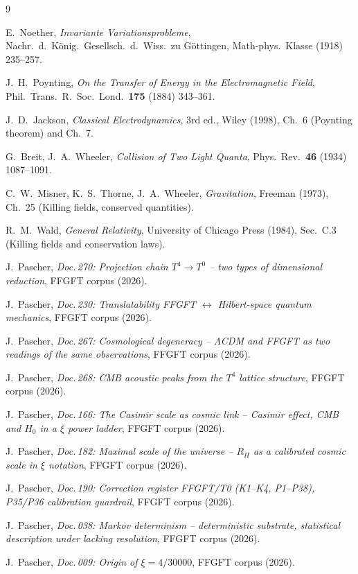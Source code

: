 \begin{thebibliography}{9}

E.~Noether,
\emph{Invariante Variationsprobleme},
Nachr.\ d.\ König.\ Gesellsch.\ d.\ Wiss.\ zu Göttingen,
Math-phys.\ Klasse (1918) 235--257.

J.~H.~Poynting,
\emph{On the Transfer of Energy in the Electromagnetic Field},
Phil.\ Trans.\ R.\ Soc.\ Lond.\ \textbf{175} (1884) 343--361.

J.~D.~Jackson,
\emph{Classical Electrodynamics}, 3rd ed.,
Wiley (1998), Ch.~6 (Poynting theorem) and Ch.~7.

G.~Breit, J.~A.~Wheeler,
\emph{Collision of Two Light Quanta},
Phys.\ Rev.\ \textbf{46} (1934) 1087--1091.

C.~W.~Misner, K.~S.~Thorne, J.~A.~Wheeler,
\emph{Gravitation},
Freeman (1973), Ch.~25 (Killing fields, conserved quantities).

R.~M.~Wald,
\emph{General Relativity},
University of Chicago Press (1984), Sec.~C.3 (Killing fields and conservation
laws).

J.~Pascher, \emph{Doc.\,270: Projection chain $T^4\to T^0$ -- two types of
dimensional reduction}, FFGFT corpus (2026).

J.~Pascher, \emph{Doc.\,230: Translatability FFGFT $\leftrightarrow$
Hilbert-space quantum mechanics}, FFGFT corpus (2026).

J.~Pascher, \emph{Doc.\,267: Cosmological degeneracy -- $\Lambda$CDM and FFGFT
as two readings of the same observations}, FFGFT corpus (2026).

J.~Pascher, \emph{Doc.\,268: CMB acoustic peaks from the $T^4$ lattice
structure}, FFGFT corpus (2026).

J.~Pascher, \emph{Doc.\,166: The Casimir scale as cosmic link -- Casimir
effect, CMB and $H_0$ in a $\xi$ power ladder}, FFGFT corpus (2026).

J.~Pascher, \emph{Doc.\,182: Maximal scale of the universe -- $R_H$ as a
calibrated cosmic scale in $\xi$ notation}, FFGFT corpus (2026).

J.~Pascher, \emph{Doc.\,190: Correction register FFGFT/T0 (K1--K4, P1--P38),
P35/P36 calibration guardrail}, FFGFT corpus (2026).

J.~Pascher, \emph{Doc.\,038: Markov determinism -- deterministic substrate,
statistical description under lacking resolution}, FFGFT corpus (2026).

J.~Pascher, \emph{Doc.\,009: Origin of $\xi = 4/30000$}, FFGFT corpus (2026).

\end{thebibliography}
